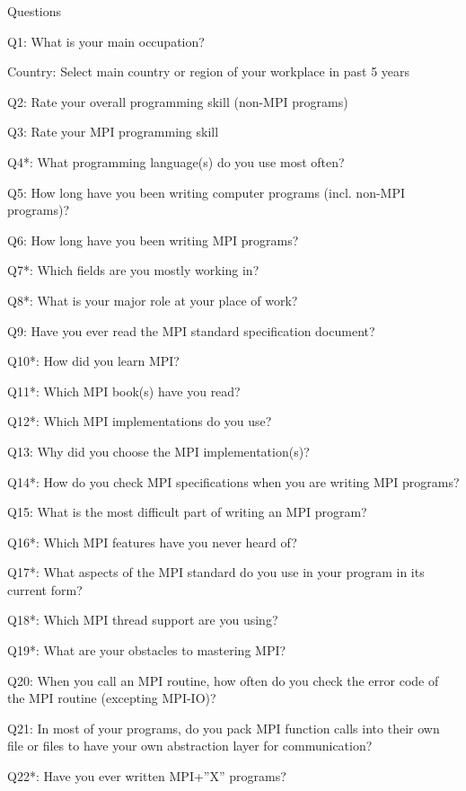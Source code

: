 \documentclass[submit,techrep,noauthor,english]{ipsj}
\begin{document}
\begin{table}
  \caption{Questions}\label{tab:questions}
\begin{description}
\item{Q1:} What is your main occupation?
\item{Country:} Select main country or region of your workplace in
  past 5 years 
\item{Q2:} Rate your overall programming skill (non-MPI programs) 
\item{Q3:} Rate your MPI programming skill
\item{Q4*:} What programming language(s) do you use most often?
\item{Q5:} How long have you been writing computer programs
  (incl. non-MPI programs)? 
\item{Q6:} How long have you been writing MPI programs?
\item{Q7*:} Which fields are you mostly working in?
\item{Q8*:} What is your major role at your place of work?
\item{Q9:} Have you ever read the MPI standard specification document?
\item{Q10*:} How did you learn MPI?
\item{Q11*:} Which MPI book(s) have you read?
\item{Q12*:} Which MPI implementations do you use?
\item{Q13:} Why did you choose the MPI implementation(s)?
\item{Q14*:} How do you check MPI specifications when you are writing
  MPI programs? 
\item{Q15:} What is the most difficult part of writing an MPI program?
\item{Q16*:} Which MPI features have you never heard of?
\item{Q17*:} What aspects of the MPI standard do you use in your
  program in its current form? 
\item{Q18*:} Which MPI thread support are you using?
\item{Q19*:} What are your obstacles to mastering MPI?
\item{Q20:} When you call an MPI routine, how often do you check the
  error code of the MPI routine  (excepting MPI-IO)? 
\item{Q21:} In most of your programs, do you pack MPI function calls
  into their own file or files to have your own abstraction layer for
  communication? 
\item{Q22*:} Have you ever written MPI+''X'' programs?

\end{description}
\end{table}
\end{document}
